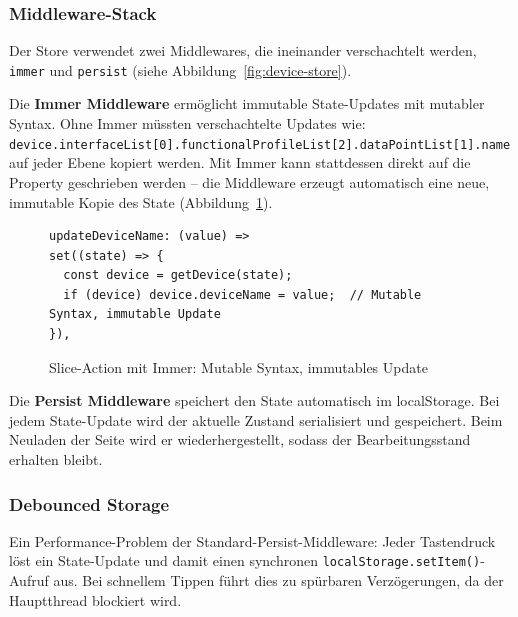 \documentclass[a4paper,12pt]{article}
\newcommand{\code}[1]{\texttt{#1}}
\begin{document}
\subsubsection{Middleware-Stack}

Der Store verwendet zwei Middlewares, die ineinander verschachtelt werden, \code{immer} und \code{persist} 
(siehe Abbildung~\ref{fig:device-store}). \newline

\noindent Die \textbf{Immer Middleware} ermöglicht immutable State-Updates mit mutabler Syntax. Ohne Immer müssten 
verschachtelte Updates wie: \newline \code{device.interfaceList[0].functionalProfileList[2].dataPointList[1].name} 
auf jeder Ebene kopiert werden. Mit Immer kann stattdessen direkt auf die Property geschrieben werden -- 
die Middleware erzeugt automatisch eine neue, immutable Kopie des State (Abbildung~\ref{fig:immer-action}). \newline

\begin{figure}[H]
  \centering
  \begin{lstlisting}[language=typescriptselective,frame=single,backgroundcolor=\color{gray!10},basicstyle=\ttfamily\scriptsize,breaklines=true]
updateDeviceName: (value) =>
set((state) => {
  const device = getDevice(state);
  if (device) device.deviceName = value;  // Mutable Syntax, immutable Update
}),
  \end{lstlisting}
  \caption{Slice-Action mit Immer: Mutable Syntax, immutables Update}
  \label{fig:immer-action}
\end{figure}

\noindent Die \textbf{Persist Middleware} speichert den State automatisch im localStorage. Bei jedem 
State-Update wird der aktuelle Zustand serialisiert und gespeichert. Beim Neuladen der Seite wird er 
wiederhergestellt, sodass der Bearbeitungsstand erhalten bleibt.

\subsubsection{Debounced Storage}

Ein Performance-Problem der Standard-Persist-Middleware: Jeder Tastendruck löst ein State-Update und damit 
einen synchronen \code{localStorage.setItem()}-Aufruf aus. Bei schnellem Tippen führt dies zu spürbaren 
Verzögerungen, da der Hauptthread blockiert wird. \newline
\end{document}
